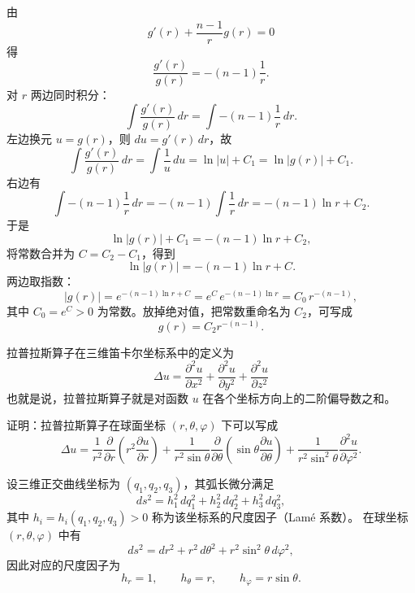 \begin{example}
    由
\[
g'(r) + \frac{n-1}{r}g(r)=0
\]
得
\[
\frac{g'(r)}{g(r)} = -(n-1)\frac{1}{r}.
\]
对 $r$ 两边同时积分：
\[
\int \frac{g'(r)}{g(r)}\,dr
= \int -(n-1)\frac{1}{r}\,dr.
\]
左边换元 $u=g(r)$，则 $du=g'(r)\,dr$，故
\[
\int \frac{g'(r)}{g(r)}\,dr
= \int \frac{1}{u}\,du
= \ln|u| + C_1
= \ln|g(r)| + C_1.
\]
右边有
\[
\int -(n-1)\frac{1}{r}\,dr
= -(n-1)\int \frac{1}{r}\,dr
= -(n-1)\ln r + C_2.
\]
于是
\[
\ln|g(r)| + C_1 = -(n-1)\ln r + C_2,
\]
将常数合并为 $C=C_2-C_1$，得到
\[
\ln|g(r)| = -(n-1)\ln r + C.
\]
两边取指数：
\[
|g(r)| = e^{-(n-1)\ln r + C}
       = e^{C}\,e^{-(n-1)\ln r}
       = C_0\,r^{-(n-1)},
\]
其中 $C_0=e^{C}>0$ 为常数。放掉绝对值，把常数重命名为 $C_2$，可写成
\[
g(r)=C_2 r^{-(n-1)}.
\]
\end{example}
\begin{dxtips}
    拉普拉斯算子在三维笛卡尔坐标系中的定义为
\[
\boxed{\displaystyle
\Delta u
= \frac{\partial^2 u}{\partial x^2}
  + \frac{\partial^2 u}{\partial y^2}
  + \frac{\partial^2 u}{\partial z^2}
}
\]
也就是说，拉普拉斯算子就是对函数 $u$ 在各个坐标方向上的二阶偏导数之和。
\end{dxtips}
\begin{homework}[2]
证明：拉普拉斯算子在球面坐标 $(r,\theta,\varphi)$ 下可以写成
\[
\Delta u
=\frac1{r^2}\frac{\partial}{\partial r}\!\left(r^2\frac{\partial u}{\partial r}\right)
+\frac1{r^2\sin\theta}\frac{\partial}{\partial\theta}\!\left(\sin\theta\frac{\partial u}{\partial\theta}\right)
+\frac1{r^2\sin^2\theta}\frac{\partial^2 u}{\partial\varphi^2}.
\]
\end{homework}
\begin{definition}
设三维正交曲线坐标为 $(q_1,q_2,q_3)$，其弧长微分满足
\[
ds^2=h_1^2\,dq_1^2+h_2^2\,dq_2^2+h_3^2\,dq_3^2,
\]
其中 $h_i=h_i(q_1,q_2,q_3)>0$ 称为该坐标系的尺度因子（Lam\'e 系数）。
在球坐标 $(r,\theta,\varphi)$ 中有
\[
ds^2=dr^2+r^2\,d\theta^2+r^2\sin^2\theta\,d\varphi^2,
\]
因此对应的尺度因子为
\[
h_r=1,\qquad h_\theta=r,\qquad h_\varphi=r\sin\theta.
\]
\end{definition}

